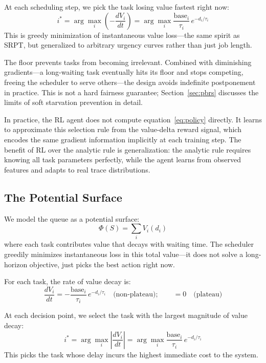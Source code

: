 \documentclass[10pt,twocolumn]{article}
\theoremstyle{remark}
\begin{document}
At each scheduling step, we pick the task losing value fastest right
now:
\begin{equation}
  i^* = \arg\max_i \left(-\frac{dV_i}{dt}\right)
  = \arg\max_i \frac{\mathrm{base}_i}{\tau_i}\,
  e^{-d_i/\tau_i}
  \label{eq:policy}
\end{equation}
This is greedy minimization of instantaneous value loss---the same
spirit as SRPT, but generalized to arbitrary urgency curves rather
than just job length.

The floor prevents tasks from becoming irrelevant. Combined with
diminishing gradients---a long-waiting task eventually hits its
floor and stops competing, freeing the scheduler to serve
others---the design avoids indefinite postponement in practice.
This is not a hard fairness guarantee; Section~\ref{sec:pbrs}
discusses the limits of soft starvation prevention in detail.

In practice, the RL agent does not compute
equation~\eqref{eq:policy} directly. It learns to approximate this
selection rule from the value-delta reward signal, which encodes the
same gradient information implicitly at each training step. The
benefit of RL over the analytic rule is generalization: the analytic
rule requires knowing all task parameters perfectly, while the agent
learns from observed features and adapts to real trace distributions.

\subsection{The Potential Surface}

We model the queue as a potential surface:
\begin{equation}
  \Phi(S) = \sum_i V_i(d_i)
  \label{eq:potential}
\end{equation}
where each task contributes value that decays with waiting time. The
scheduler greedily minimizes instantaneous loss in this total
value---it does not solve a long-horizon objective, just picks the
best action right now.

For each task, the rate of value decay is:
\begin{equation}
  \frac{dV_i}{dt} = -\frac{\mathrm{base}_i}{\tau_i}\,
  e^{-d_i/\tau_i}
  \quad\text{(non-plateau)};\qquad
  = 0\quad\text{(plateau)}
  \label{eq:decay}
\end{equation}

At each decision point, we select the task with the largest
magnitude of value decay:
\begin{equation}
  i^* = \arg\max_i \left|\frac{dV_i}{dt}\right|
  = \arg\max_i \frac{\mathrm{base}_i}{\tau_i}\,
  e^{-d_i/\tau_i}
  \label{eq:selection}
\end{equation}
This picks the task whose delay incurs the highest immediate cost to
the system.
\end{document}
